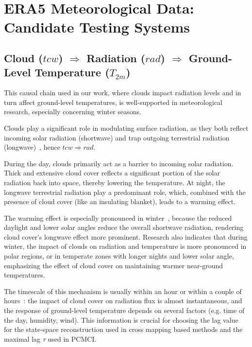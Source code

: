\section{ERA5 Meteorological Data: Candidate Testing Systems}
\label{appsec:era5}

\subsection{Cloud ($tcw$) $\Rightarrow$ Radiation ($rad$) $\Rightarrow$ Ground-Level Temperature ($T_{2m}$)}
\label{appsec:weather-chain}

This causal chain used in our work, where clouds impact radiation levels and in turn affect ground-level temperatures, is well-supported in meteorological research, especially concerning winter seasons.

Clouds play a significant role in modulating surface radiation, as they both reflect incoming solar radiation (shortwave) and trap outgoing terrestrial radiation (longwave)~\citep{stephens2005cloud}, hence $tcw\Rightarrow rad$.

During the day, clouds primarily act as a barrier to incoming solar radiation. Thick and extensive cloud cover reflects a significant portion of the solar radiation back into space, thereby lowering the temperature. At night, the longwave terrestrial radiation play a predominant role, which, combined with the presence of cloud cover (like an insulating blanket), leads to a warming effect. 

The warming effect is especially pronounced in winter~\citep{ramanathan1989cloud}, because the reduced daylight and lower solar angles reduce the overall shortwave radiation, rendering cloud cover's longwave effect more prominent. Research also indicates that during winter, the impact of clouds on radiation and temperature is more pronounced in polar regions, or in temperate zones with longer nights and lower solar angle, emphasizing the effect of cloud cover on maintaining warmer near-ground temperatures.

The timescale of this mechanism is usually within an hour or within a couple of hours~\citep{stephens2005cloud,pielke2005should}: the impact of cloud cover on radiation flux is almost instantaneous, and the response of ground-level temperature depends on several factors (e.g. time of the day, humidity, wind). This information is crucial for choosing the lag value for the state-space reconstruction used in cross mapping based methods and the maximal lag $\tau$ used in PCMCI. 


